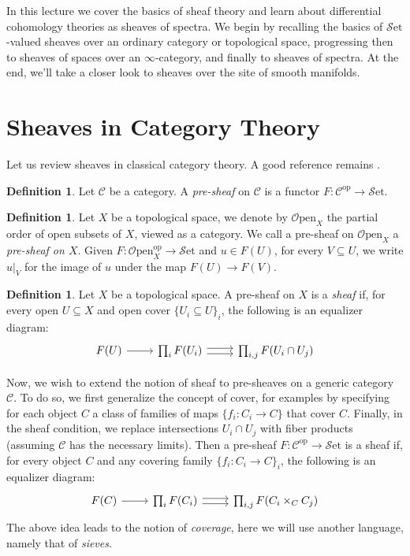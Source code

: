 \documentclass[a4paper]{book}
\newcommand{\lC}{\mathcal{C}}
\newcommand{\lO}{\mathcal{O}}
\newcommand{\lS}{\mathcal{S}}
\newcommand{\op}{\mathrm{op}}
\newcommand{\set}{\lS\mathrm{et}} %
\newcommand{\Open}{\lO\mathrm{pen}} %
\theoremstyle{definition}
\newtheorem{definition}[equation]{Definition}
\theoremstyle{remark}
\numberwithin{equation}{section}
\begin{document}
In this lecture we cover the basics of sheaf theory and learn about differential cohomology theories as sheaves of spectra. We begin by recalling the basics of $\set$-valued sheaves over an ordinary category or topological space, progressing then to sheaves of spaces over an $\infty$-category, and finally to sheaves of spectra. At the end, we'll take a closer look to sheaves over the site of smooth manifolds.  
	
\section{Sheaves in Category Theory}

	Let us review sheaves in classical category theory. A good reference remains \cite{maclanemoerdijk1994topos}.
	\begin{definition}
		Let $\lC$ be a category. A \emph{pre-sheaf} on $\lC$ is a functor $F:\lC^{\op}\to\set$. 
	\end{definition}
	\begin{definition}
		Let $X$ be a topological space, we denote by $\Open_X$ the partial order of open subsets of $X$, viewed as a category. We call a pre-sheaf on $\Open_X$ a \emph{pre-sheaf on $X$}. Given $F:\Open_X^{\op}\to\set$ and $u\in F(U)$, for every $V\subseteq U$, we write $u|_V$ for the image of $u$ under the map $F(U)\to F(V)$. 
	\end{definition}	
	\begin{definition}
		Let $X$ be a topological space. A pre-sheaf on $X$ is a \emph{sheaf} if, for every open $U\subseteq X$ and open cover $\{U_i\subseteq U\}_i$, the following is an equalizer diagram:
		\[
		\begin{tikzcd}
			F(U) \arrow[r] & \prod_iF(U_i) \arrow[r, shift left=1] \arrow[r, shift right = 1] &   \prod_{i,j} F(U_i \cap U_j) 
		\end{tikzcd}
		\]
	\end{definition}
	Now, we wish to extend the notion of sheaf to pre-sheaves on a generic category $\lC$.
	To do so, we first generalize the concept of cover, for examples by specifying for each object $C$ a class of families of maps $\{f_i:C_i\to C\}$ that {cover} $C$. Finally, in the sheaf condition, we replace intersections $U_i\cap U_j$ with fiber products (assuming $\lC$ has the necessary limits). Then a pre-sheaf $F:\lC^{\op}\to\set$ is a sheaf if, for every object $C$ and any covering family $\{f_i:C_i\to C\}_i$, the following is an equalizer diagram:\[
		\begin{tikzcd}
			F(C) \arrow[r] & \prod_i F(C_i) \arrow[r, shift left=1] \arrow[r, shift right = 1] &   \prod_{i,j} F(C_i \times_C C_j) 
		\end{tikzcd}
		\]
	The above idea leads to the notion of \emph{coverage}, here we will use another language, namely that of \emph{sieves}. 
	
\end{document}
